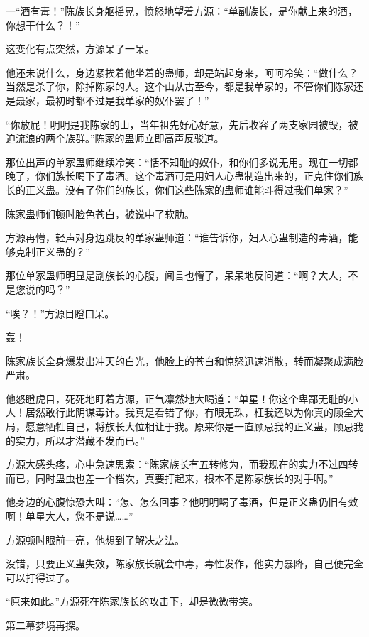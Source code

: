 
\begin{this_body}

一“酒有毒！”陈族长身躯摇晃，愤怒地望着方源：“单副族长，是你献上来的酒，你想干什么？！”

这变化有点突然，方源呆了一呆。

他还未说什么，身边紧挨着他坐着的蛊师，却是站起身来，呵呵冷笑：“做什么？当然是杀了你，除掉陈家的人。这个山从古至今，都是我单家的，不管你们陈家还是聂家，最初时都不过是我单家的奴仆罢了！”

“你放屁！明明是我陈家的山，当年祖先好心好意，先后收容了两支家园被毁，被迫流浪的两个族群。”陈家的蛊师立即高声反驳道。

那位出声的单家蛊师继续冷笑：“恬不知耻的奴仆，和你们多说无用。现在一切都晚了，你们族长喝下了毒酒。这个毒酒可是用妇人心蛊制造出来的，正克住你们族长的正义蛊。没有了你们的族长，你们这些陈家的蛊师谁能斗得过我们单家？”

陈家蛊师们顿时脸色苍白，被说中了软肋。

方源再懵，轻声对身边跳反的单家蛊师道：“谁告诉你，妇人心蛊制造的毒酒，能够克制正义蛊的？”

那位单家蛊师明显是副族长的心腹，闻言也懵了，呆呆地反问道：“啊？大人，不是您说的吗？”

“唉？！”方源目瞪口呆。

轰！

陈家族长全身爆发出冲天的白光，他脸上的苍白和惊怒迅速消散，转而凝聚成满脸严肃。

他怒瞪虎目，死死地盯着方源，正气凛然地大喝道：“单星！你这个卑鄙无耻的小人！居然敢行此阴谋毒计。我真是看错了你，有眼无珠，枉我还以为你真的顾全大局，愿意牺牲自己，将族长大位相让于我。原来你是一直顾忌我的正义蛊，顾忌我的实力，所以才潜藏不发而已。”

方源大感头疼，心中急速思索：“陈家族长有五转修为，而我现在的实力不过四转而已，同时蛊虫也差一个档次，真要打起来，根本不是陈家族长的对手啊。”

他身边的心腹惊恐大叫：“怎、怎么回事？他明明喝了毒酒，但是正义蛊仍旧有效啊！单星大人，您不是说……”

方源顿时眼前一亮，他想到了解决之法。

没错，只要正义蛊失效，陈家族长就会中毒，毒性发作，他实力暴降，自己便完全可以打得过了。

“原来如此。”方源死在陈家族长的攻击下，却是微微带笑。

第二幕梦境再探。


\end{this_body}

